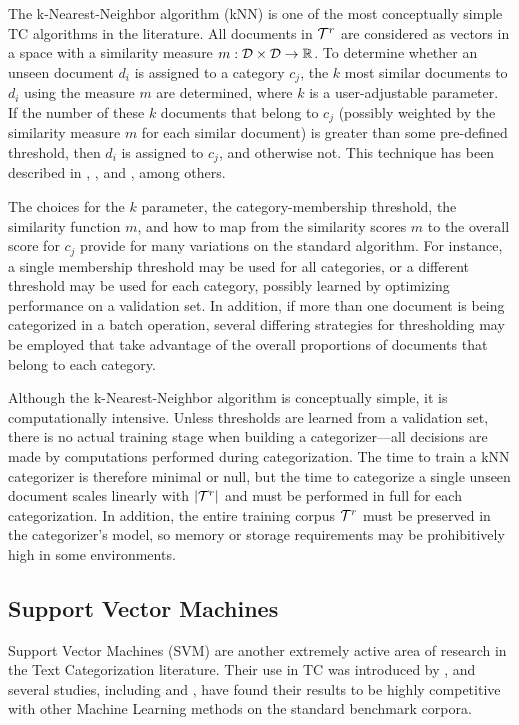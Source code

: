 The k-Nearest-Neighbor algorithm (kNN) is one of the most conceptually
simple TC algorithms in the literature.  All documents in $\mathcal{T}^r$ are
considered as vectors in a space with a similarity measure $m: \mathcal{D}
\times \mathcal{D} \to \mathbb{R}$.  To determine whether an unseen document
$d_i$ is assigned to a category $c_j$, the $k$ most similar documents
to $d_i$ using the measure $m$ are determined, where $k$ is a
user-adjustable parameter.  If the number of these $k$ documents that
belong to $c_j$ (possibly weighted by the similarity measure $m$ for
each similar document) is greater than some pre-defined threshold,
then $d_i$ is assigned to $c_j$, and otherwise not.  This technique
has been described in \cite[p. 28]{sebastiani:02}, \cite{yang:99}, and
\cite{yang:97}, among others.

The choices for the $k$ parameter, the category-membership threshold,
the similarity function $m$, and how to map from the similarity scores
$m$ to the overall score for $c_j$ provide for many variations on the
standard algorithm.  For instance, a single membership threshold may
be used for all categories, or a different threshold may be used for
each category, possibly learned by optimizing performance on a
validation set.  In addition, if more than one document is being
categorized in a batch operation, several differing strategies for
thresholding may be employed that take advantage of the overall
proportions of documents that belong to each category.\cite{yang:01}

Although the k-Nearest-Neighbor algorithm is conceptually simple, it
is computationally intensive.  Unless thresholds are learned from a
validation set, there is no actual training stage when building a
categorizer---all decisions are made by computations performed during
categorization.  The time to train a kNN categorizer is therefore
minimal or null, but the time to categorize a single unseen document
scales linearly with $|\mathcal{T}^r|$ and must be performed in full for each
categorization.  In addition, the entire training corpus $\mathcal{T}^r$ must
be preserved in the categorizer's model, so memory or storage
requirements may be prohibitively high in some environments.

\subsection{Support Vector Machines}

Support Vector Machines (SVM) are another extremely active area of
research in the Text Categorization literature.  Their use in TC was
introduced by \cite{joachims:98}, and several studies, including
\cite{joachims:98} and \cite{yang:99}, have found their results to be
highly competitive with other Machine Learning methods on the standard
benchmark corpora.

